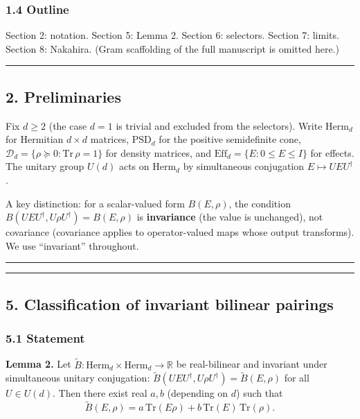 \documentclass[
]{article}
\begin{document}
\subsubsection{1.4 Outline}\label{outline}

Section 2: notation. Section 5: Lemma 2. Section 6: selectors. Section
7: limits. Section 8: Nakahira. (Gram scaffolding of the full manuscript
is omitted here.)

\begin{center}\rule{0.5\linewidth}{0.5pt}\end{center}

\subsection{2. Preliminaries}\label{preliminaries}

Fix \(d\geq 2\) (the case \(d=1\) is trivial and excluded from the
selectors). Write \(\mathrm{Herm}_d\) for Hermitian \(d\times d\)
matrices, \(\mathrm{PSD}_d\) for the positive semidefinite cone,
\(\mathcal D_d=\{\rho\succeq 0:\mathrm{Tr}\,\rho=1\}\) for density
matrices, and \(\mathrm{Eff}_d=\{E:0\leq E\leq I\}\) for effects. The
unitary group \(U(d)\) acts on \(\mathrm{Herm}_d\) by simultaneous
conjugation \(E\mapsto UEU^\dagger\).

A key distinction: for a scalar-valued form \(B(E,\rho)\), the condition
\(B(UEU^\dagger,U\rho U^\dagger)=B(E,\rho)\) is \textbf{invariance} (the
value is unchanged), not covariance (covariance applies to
operator-valued maps whose output transforms). We use ``invariant''
throughout.

\begin{center}\rule{0.5\linewidth}{0.5pt}\end{center}

\begin{center}\rule{0.5\linewidth}{0.5pt}\end{center}

\subsection{5. Classification of invariant bilinear
pairings}\label{classification-of-invariant-bilinear-pairings}

\subsubsection{5.1 Statement}\label{statement}

\textbf{Lemma 2.} Let
\(\widetilde B:\mathrm{Herm}_d\times\mathrm{Herm}_d\to\mathbb R\) be
real-bilinear and invariant under simultaneous unitary conjugation:
\(\widetilde B(UEU^\dagger,U\rho U^\dagger)=\widetilde B(E,\rho)\) for
all \(U\in U(d)\). Then there exist real \(a,b\) (depending on \(d\))
such that
\[\widetilde B(E,\rho)=a\,\mathrm{Tr}(E\rho)+b\,\mathrm{Tr}(E)\,\mathrm{Tr}(\rho).\]
\end{document}
